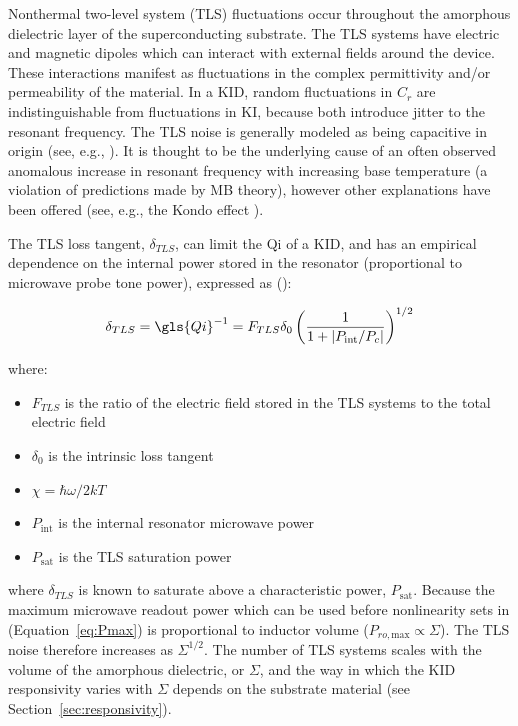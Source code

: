 Nonthermal two-level system (TLS) fluctuations occur throughout the amorphous dielectric layer of the superconducting substrate. The TLS systems have electric and magnetic dipoles which can interact with external fields around the device. These interactions manifest as fluctuations in the complex permittivity and/or permeability of the material. In a KID, random fluctuations in $C_{r}$ are indistinguishable from fluctuations in KI, because both introduce jitter to the resonant frequency. The TLS noise is generally modeled as being capacitive in origin (see, e.g., \citet{gao2008physics,zmuidzinas2012superconducting}). It is thought to be the underlying cause of an often observed anomalous increase in resonant frequency with increasing base temperature (a violation of predictions made by MB theory), however other explanations have been offered (see, e.g., the Kondo effect \citep{noguchi2018analysis}).

The TLS loss tangent, $\delta_{TLS}$, can limit the \gls{Qi} of a KID, and has an empirical dependence on the internal power stored in the resonator (proportional to microwave probe tone power), expressed as (\citet{barry2014development,martinis2005decoherence}):

\begin{equation}
  \delta_{TLS} = \gls{Qi}^{-1} = F_{TLS}\delta_{0} \left(\frac{1}{1 + \left| P_{\mathrm{int}}/P_{c} \right|} \right)^{1/2}
\end{equation}

where:
\begin{itemize}[label={},nosep]
  \item $F_{TLS}$ is the ratio of the electric field stored in the TLS systems to the total electric field
  \item $\delta_{0}$ is the intrinsic loss tangent
  \item $\chi = \hbar\omega/2kT$
  \item $P_{\mathrm{int}}$ is the internal resonator microwave power
  \item $P_{\mathrm{sat}}$ is the TLS saturation power
\end{itemize}

where $\delta_{TLS}$ is known to saturate above a characteristic power, $P_{\mathrm{sat}}$. Because the maximum microwave readout power which can be used before nonlinearity sets in (Equation~\ref{eq:Pmax}) is proportional to inductor volume ($P_{ro\mathrm{,max}} \propto \Sigma$). The TLS noise therefore increases as $\Sigma^{1/2}$. The number of TLS systems scales with the volume of the amorphous dielectric, or $\Sigma$, and the way in which the KID responsivity varies with $\Sigma$ depends on the substrate material (see Section~\ref{sec:responsivity}).

